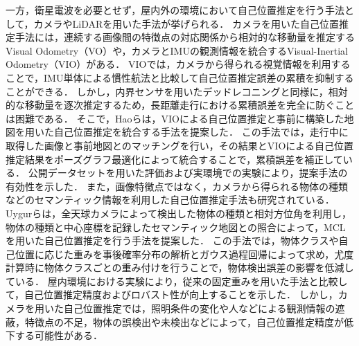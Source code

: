 一方，衛星電波を必要とせず，屋内外の環境において自己位置推定を行う手法として，カメラやLiDARを用いた手法が挙げられる．
カメラを用いた自己位置推定手法には，連続する画像間の特徴点の対応関係から相対的な移動量を推定するVisual Odometry（VO）や，カメラとIMUの観測情報を統合するVisual-Inertial Odometry（VIO）がある．
VIOでは，カメラから得られる視覚情報を利用することで，IMU単体による慣性航法と比較して自己位置推定誤差の累積を抑制することができる．
しかし，内界センサを用いたデッドレコニングと同様に，相対的な移動量を逐次推定するため，長距離走行における累積誤差を完全に防ぐことは困難である．
そこで，Haoらは，VIOによる自己位置推定と事前に構築した地図を用いた自己位置推定を統合する手法を提案した\cite{hao2023global}．
この手法では，走行中に取得した画像と事前地図とのマッチングを行い，その結果とVIOによる自己位置推定結果をポーズグラフ最適化によって統合することで，累積誤差を補正している．
公開データセットを用いた評価および実環境での実験により，提案手法の有効性を示した．
また，画像特徴点ではなく，カメラから得られる物体の種類などのセマンティック情報を利用した自己位置推定手法も研究されている．
Uygurらは，全天球カメラによって検出した物体の種類と相対方位角を利用し，物体の種類と中心座標を記録したセマンティック地図との照合によって，MCLを用いた自己位置推定を行う手法を提案した\cite{uygur2024data}．
この手法では，物体クラスや自己位置に応じた重みを事後確率分布の解析とガウス過程回帰によって求め，尤度計算時に物体クラスごとの重み付けを行うことで，物体検出誤差の影響を低減している．
屋内環境における実験により，従来の固定重みを用いた手法と比較して，自己位置推定精度およびロバスト性が向上することを示した．
しかし，カメラを用いた自己位置推定では，照明条件の変化や人などによる観測情報の遮蔽，特徴点の不足，物体の誤検出や未検出などによって，自己位置推定精度が低下する可能性がある．

